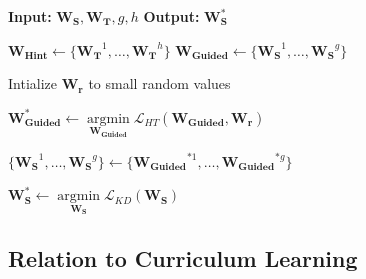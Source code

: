 \documentclass{article} %
\DeclareMathOperator*{\argmin}{argmin}
\newcommand*{\argminl}{\argmin\limits}
\begin{document}
\begin{algorithm}
\caption{FitNet Stage-Wise Training.\newline 
  The algorithm receives as
  input the trained parameters $\mathbf{W_T}$ of a teacher, the randomly
  initialized parameters $\mathbf{W_S}$ of a FitNet, and two indices $h$
  and $g$ corresponding to hint/guided layers, respectively. Let
  $\mathbf{W_{Hint}}$ be the teacher's parameters up to the hint layer
  $h$. Let $\mathbf{W_{Guided}}$ be the FitNet's parameters up to the
  guided layer $g$. Let $\mathbf{W_r}$ be the regressor's parameters. The first
  stage consists in pre-training the student network up to the guided
  layer, based on the prediction error of the teacher's hint layer (line
  4). The second stage is a KD training of the whole network (line 6).
}
\label{alg:StudentTraining}
%
\begin{algorithmic}[1]
\small
\STATEx \textbf{Input:} $\mathbf{W_S}, \mathbf{W_T}, g, h$
\STATEx \textbf{Output:} $\mathbf{W_S^*}$

\STATE $\mathbf{W_{Hint}} \leftarrow  \{\mathbf{W_T}^1, \ldots, \mathbf{W_T}^h\}$
\STATE $\mathbf{W_{Guided}} \leftarrow  \{\mathbf{W_S}^1, \ldots, \mathbf{W_S}^g\}$

\STATE Intialize $\mathbf{W_r} $ to small random values

\STATE $\mathbf{W_{Guided}^*} \leftarrow \argminl_\mathbf{W_{Guided}} \mathcal{L}_{HT}(\mathbf{W_{Guided}},\mathbf{W_r})$


\STATE $\{\mathbf{W_S}^1, \ldots, \mathbf{W_S}^g\} \leftarrow \{\mathbf{W_{Guided}}^{*1}, \ldots, \mathbf{W_{Guided}}^{*g}\}$

\STATE $\mathbf{W_S^*} \leftarrow \argminl_\mathbf{W_S} \mathcal{L}_{KD}(\mathbf{W_S})$



\end{algorithmic}
\vspace*{-1mm}
\end{algorithm}

\vspace*{-2mm}
\subsection{Relation to Curriculum Learning}
\vspace*{-1mm}
\end{document}
